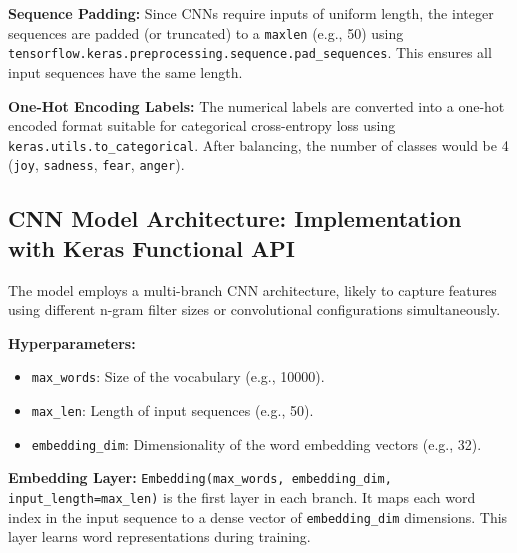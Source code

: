 \documentclass[twocolumn]{article}
\begin{document}
\vspace{0.5em}
\textbf{Sequence Padding:} 
Since CNNs require inputs of uniform length, the integer sequences are padded (or truncated) to a \texttt{maxlen} (e.g., 50) using \texttt{tensorflow.keras.preprocessing.sequence.pad\_sequences}. This ensures all input sequences have the same length.

\vspace{0.5em}
\textbf{One-Hot Encoding Labels:} 
The numerical labels are converted into a one-hot encoded format suitable for categorical cross-entropy loss using \texttt{keras.utils.to\_categorical}. After balancing, the number of classes would be 4 (\texttt{joy}, \texttt{sadness}, \texttt{fear}, \texttt{anger}).

\subsection{CNN Model Architecture: Implementation with Keras Functional API}

The model employs a multi-branch CNN architecture, likely to capture features using different n-gram filter sizes or convolutional configurations simultaneously.

\vspace{0.5em}
\textbf{Hyperparameters:}
\begin{itemize}
    \item \texttt{max\_words}: Size of the vocabulary (e.g., 10000).
    \item \texttt{max\_len}: Length of input sequences (e.g., 50).
    \item \texttt{embedding\_dim}: Dimensionality of the word embedding vectors (e.g., 32).
\end{itemize}

\vspace{0.5em}
\textbf{Embedding Layer:} 
\texttt{Embedding(max\_words, embedding\_dim, input\_length=max\_len)} is the first layer in each branch. It maps each word index in the input sequence to a dense vector of \texttt{embedding\_dim} dimensions. This layer learns word representations during training.
\end{document}
